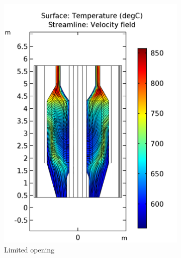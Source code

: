 \documentclass{elsarticle}
\begin{document}
\begin{figure}
\centering
    \begin{subfigure}[b]{0.42\textwidth}
        \centering
         \includegraphics[width=\textwidth]{images/diffusion/mk1/SS/flow_opti/T_flibe_init.png}
        \caption{Limited opening}
    \end{subfigure}%
    ~ 
    \begin{subfigure}[b]{0.42\textwidth}
        \centering

\end{subfigure}
\end{figure}
\end{document}
